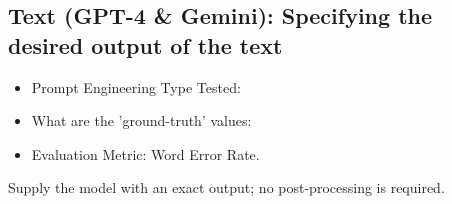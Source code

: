\subsection{Text (GPT-4 \& Gemini): Specifying the desired output of the text}

\begin{itemize}
    \item Prompt Engineering Type Tested:
    \item What are the 'ground-truth' values:
    \item Evaluation Metric: Word Error Rate.
\end{itemize}

Supply the model with an exact output; no post-processing is required.

